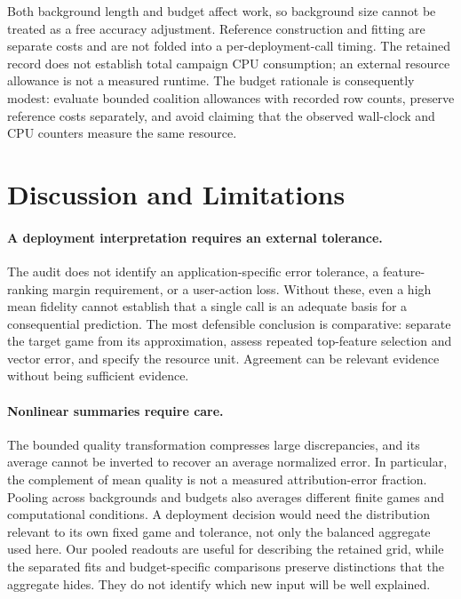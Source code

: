 \documentclass{article}
\begin{document}
Both background length and budget affect work, so background size cannot be treated as a free accuracy adjustment. Reference construction and fitting are separate costs and are not folded into a per-deployment-call timing. The retained record does not establish total campaign CPU consumption; an external resource allowance is not a measured runtime. The budget rationale is consequently modest: evaluate bounded coalition allowances with recorded row counts, preserve reference costs separately, and avoid claiming that the observed wall-clock and CPU counters measure the same resource.

\section{Discussion and Limitations}
\paragraph{A deployment interpretation requires an external tolerance.}
The audit does not identify an application-specific error tolerance, a feature-ranking margin requirement, or a user-action loss. Without these, even a high mean fidelity cannot establish that a single call is an adequate basis for a consequential prediction. The most defensible conclusion is comparative: separate the target game from its approximation, assess repeated top-feature selection and vector error, and specify the resource unit. Agreement can be relevant evidence without being sufficient evidence.

\paragraph{Nonlinear summaries require care.}
The bounded quality transformation compresses large discrepancies, and its average cannot be inverted to recover an average normalized error. In particular, the complement of mean quality is not a measured attribution-error fraction. Pooling across backgrounds and budgets also averages different finite games and computational conditions. A deployment decision would need the distribution relevant to its own fixed game and tolerance, not only the balanced aggregate used here. Our pooled readouts are useful for describing the retained grid, while the separated fits and budget-specific comparisons preserve distinctions that the aggregate hides. They do not identify which new input will be well explained.
\end{document}
